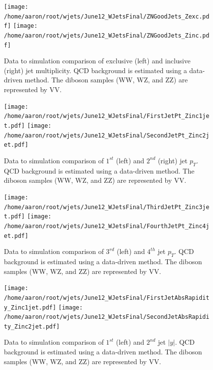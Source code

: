 \documentclass[oneside, letterpaper, oldfontcommands]{memoir}
\begin{document}
\begin{table}
\begin{figure}[!Hhtbp]
\begin{center}
\texttt{[image: /home/aaron/root/wjets/June12\_WJetsFinal/ZNGoodJets\_Zexc.pdf]}
\texttt{[image: /home/aaron/root/wjets/June12\_WJetsFinal/ZNGoodJets\_Zinc.pdf]}
\end{center}
\caption{Data to simulation comparison of exclusive (left) and inclusive (right) jet multiplicity. QCD background is estimated using a data-driven method. The diboson samples (WW, WZ, and ZZ) are represented by VV.}
\label{mult}
\end{figure}

\begin{figure}[!Hhtbp]
\begin{center}
\texttt{[image: /home/aaron/root/wjets/June12\_WJetsFinal/FirstJetPt\_Zinc1jet.pdf]}
\texttt{[image: /home/aaron/root/wjets/June12\_WJetsFinal/SecondJetPt\_Zinc2jet.pdf]}\\
\end{center}
\caption{Data to simulation comparison of $1^{st}$ (left) and $2^{nd}$ (right) jet $p_{T}$. QCD background is estimated using a data-driven method. The diboson samples (WW, WZ, and ZZ) are represented by VV.}
\label{pt12}
\end{figure}

\begin{figure}[!Hhtbp]
\begin{center}
\texttt{[image: /home/aaron/root/wjets/June12\_WJetsFinal/ThirdJetPt\_Zinc3jet.pdf]}
\texttt{[image: /home/aaron/root/wjets/June12\_WJetsFinal/FourthJetPt\_Zinc4jet.pdf]}
\end{center}
\caption{Data to simulation comparison of $3^{rd}$ (left) and $4^{th}$ jet $p_{T}$. QCD background is estimated using a data-driven method. The diboson samples (WW, WZ, and ZZ) are represented by VV.}
\label{pt34}
\end{figure}

\begin{figure}[!Hhtbp]
\begin{center}
\texttt{[image: /home/aaron/root/wjets/June12\_WJetsFinal/FirstJetAbsRapidity\_Zinc1jet.pdf]}
\texttt{[image: /home/aaron/root/wjets/June12\_WJetsFinal/SecondJetAbsRapidity\_Zinc2jet.pdf]}
\end{center}
\caption{Data to simulation comparison of $1^{st}$ (left) and $2^{nd}$ jet $|y|$. QCD background is estimated using a data-driven method. The diboson samples (WW, WZ, and ZZ) are represented by VV.}
\label{eta12}
\end{figure}


\end{table}
\end{document}
